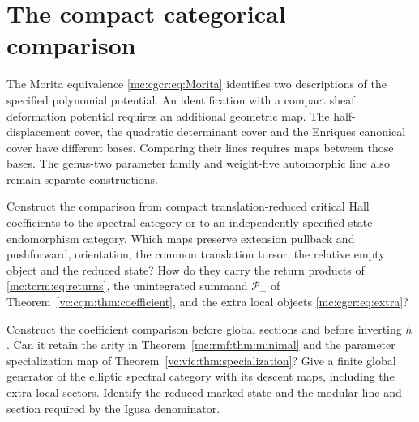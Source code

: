 \section{The compact categorical comparison}

The Morita equivalence \eqref{mc:cgcr:eq:Morita} identifies
two descriptions of the specified polynomial potential.
An identification with a compact sheaf deformation
potential requires an additional geometric map.
The half-displacement cover, the quadratic determinant
cover and the Enriques canonical cover have different bases.
Comparing their lines requires maps between those bases.
The genus-two parameter family and weight-five automorphic
line also remain separate constructions.

\begin{question}\label{mc:cgcr:qn:compact-comparison}
Construct the comparison from compact translation-reduced
critical Hall coefficients to the spectral category or
to an independently specified state endomorphism category.
Which maps preserve extension pullback and pushforward,
orientation, the common translation torsor, the relative
empty object and the reduced state? How do they carry
the return products of \eqref{mc:tcrm:eq:returns}, the
unintegrated summand $\mathcal P_-$ of
Theorem~\ref{vc:cqm:thm:coefficient}, and the extra local
objects \eqref{mc:cgcr:eq:extra}?

Construct the coefficient comparison before global sections
and before inverting $h$. Can it retain the arity in
Theorem~\ref{mc:rmf:thm:minimal} and the parameter specialization
map of Theorem~\ref{vc:vic:thm:specialization}?
Give a finite global generator of the elliptic spectral
category with its descent maps, including the extra local
sectors. Identify the reduced marked state and the modular
line and section required by the Igusa denominator.
\end{question}
